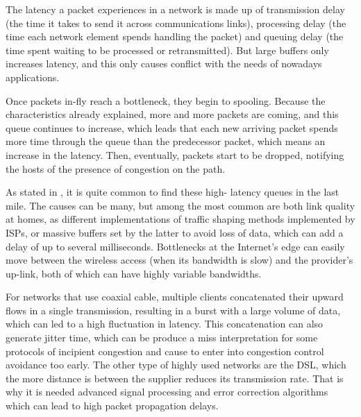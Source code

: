 The latency a packet experiences in a network is made up of transmission
delay (the time it takes to send it across communications links), processing
delay (the time each network element spends handling the packet) and queuing
delay (the time spent waiting to be processed or retransmitted). But large
buffers only increases latency, and this only causes conflict with the needs
of nowadays applications.

Once packets in-fly reach a bottleneck, they begin to spooling. Because the
characteristics already explained, more and more packets are coming, and this
queue continues to increase, which leads that each new arriving packet spends
more time through the queue than the predecessor packet, which means an
increase in the latency. Then, eventually, packets start to be dropped,
notifying the hosts of the presence of congestion on the path.

As stated in \cite{Dischinger2007CRB}, it is quite common to find these high-
latency queues in the last mile. The causes can be many, but among the most
common are both link quality at homes, as different implementations of traffic
shaping methods implemented by ISPs, or massive buffers set by the latter to
avoid loss of data, which can add a delay of up to several milliseconds.
Bottlenecks at the Internet's edge can easily move between the wireless
access (when its bandwidth is slow) and the provider's up-link, both of which
can have highly variable bandwidths.

For networks that use coaxial cable, multiple clients concatenated their
upward flows in a single transmission, resulting in a burst with a large
volume of data, which can led to a high fluctuation in latency. This
concatenation can also generate jitter time, which can be produce a miss
interpretation for some protocols of incipient congestion and cause to enter
into congestion control avoidance too early. The other type of highly used
networks are the DSL, which the more distance is between the supplier reduces
its transmission rate. That is why it is needed advanced signal processing and
error correction algorithms which can lead to high packet propagation delays.
